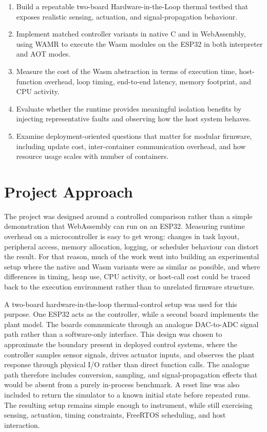 \documentclass[12pt, a4paper]{report}
\begin{document}
\begin{enumerate}
    \item Build a repeatable two-board Hardware-in-the-Loop thermal testbed that exposes realistic sensing, actuation, and signal-propagation behaviour.
    \item Implement matched controller variants in native C and in WebAssembly, using WAMR to execute the Wasm modules on the ESP32 in both interpreter and AOT modes.
    \item Measure the cost of the Wasm abstraction in terms of execution time, host-function overhead, loop timing, end-to-end latency, memory footprint, and CPU activity.
    \item Evaluate whether the runtime provides meaningful isolation benefits by injecting representative faults and observing how the host system behaves.
    \item Examine deployment-oriented questions that matter for modular firmware, including update cost, inter-container communication overhead, and how resource usage scales with number of containers.
\end{enumerate}

\section{Project Approach}

The project was designed around a controlled comparison rather than a simple demonstration that WebAssembly can run on an ESP32. Measuring runtime overhead on a microcontroller is easy to get wrong: changes in task layout, peripheral access, memory allocation, logging, or scheduler behaviour can distort the result. For that reason, much of the work went into building an experimental setup where the native and Wasm variants were as similar as possible, and where differences in timing, heap use, CPU activity, or host-call cost could be traced back to the execution environment rather than to unrelated firmware structure.

A two-board hardware-in-the-loop thermal-control setup was used for this purpose. One ESP32 acts as the controller, while a second board implements the plant model. The boards communicate through an analogue DAC-to-ADC signal path rather than a software-only interface. This design was chosen to approximate the boundary present in deployed control systems, where the controller samples sensor signals, drives actuator inputs, and observes the plant response through physical I/O rather than direct function calls. The analogue path therefore includes conversion, sampling, and signal-propagation effects that would be absent from a purely in-process benchmark. A reset line was also included to return the simulator to a known initial state before repeated runs. The resulting setup remains simple enough to instrument, while still exercising sensing, actuation, timing constraints, FreeRTOS scheduling, and host interaction.
\end{document}

